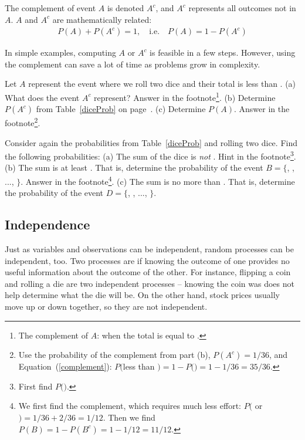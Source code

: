 \begin{termBox}{
The complement of event $A$ is denoted $A^c$, and $A^c$ represents all outcomes not in $A$. $A$ and $A^c$ are mathematically related: \vspace{-2mm}
\begin{eqnarray}\label{complement}
P(A) + P(A^c) = 1, \quad\text{i.e.}\quad P(A) = 1-P(A^c)
\end{eqnarray}\vspace{-6.5mm}}
\end{termBox}

In simple examples, computing $A$ or $A^c$ is feasible in a few steps. However, using the complement can save a lot of time as problems grow in complexity.

\begin{exercise}
Let $A$ represent the event where we roll two dice and their total is less than . (a) What does the event $A^c$ represent? Answer in the footnote\footnote{The complement of $A$: when the total is equal to .}. (b) Determine $P(A^c)$ from Table~\ref{diceProb} on page~\pageref{diceProb}. (c) Determine $P(A)$. Answer in the footnote\footnote{Use the probability of the complement from part (b), $P(A^c) = 1/36$, and Equation~(\ref{complement}): $P($less than $) = 1 - P($$) = 1 - 1/36 = 35/36$.}.
\end{exercise}

\begin{exercise} Consider again the probabilities from Table~\ref{diceProb} and rolling two dice. Find the following probabilities: (a) The sum of the dice is \emph{not} . Hint in the footnote\footnote{First find $P($$)$.}. (b) The sum is at least . That is, determine the probability of the event $B=\{$, , ..., $\}$. Answer in the footnote\footnote{We first find  the complement, which requires much less effort: $P($ or $)=1/36+2/36=1/12$. Then we find $P(B) = 1-P(B^c) = 1-1/12 = 11/12$.}. (c) The sum is no more than . That is, determine the probability of the event $D=\{$, , ..., $\}$.
\end{exercise}


\subsection{Independence}
\label{probabilityIndependence}

Just as variables and observations can be independent, random processes can be independent, too. Two processes are  if knowing the outcome of one provides no useful information about the outcome of the other. For instance, flipping a coin and rolling a die are two independent processes -- knowing the coin was  does not help determine what the die will be. On the other hand, stock prices usually move up or down together, so they are not independent.

